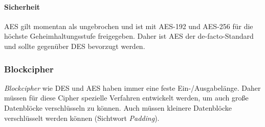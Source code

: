 \documentclass[a4paper, 11pt, accentcolor = tud3b]{tudreport}
\begin{document}
					\paragraph{Sicherheit}
						AES gilt momentan als ungebrochen und ist mit AES-192 und AES-256 für die höchste Geheimhaltungsstufe freigegeben. Daher ist AES der de-facto-Standard und sollte gegenüber DES bevorzugt werden.

                \subsubsection{Blockcipher}
                    \textit{Blockcipher} wie DES und AES haben immer eine feste Ein-/Ausgabelänge. Daher müssen für diese Cipher spezielle Verfahren entwickelt werden, um auch große Datenblöcke verschlüsseln zu können. Auch müssen kleinere Datenblöcke verschlüsselt werden können (Sichtwort \textit{Padding}).
\end{document}
